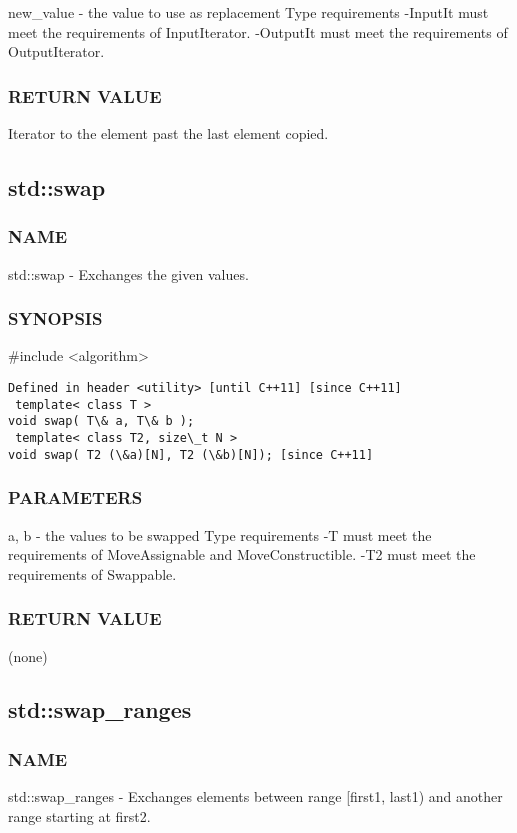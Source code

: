 new\_value - the value to use as replacement
 Type requirements
 -InputIt must meet the requirements of InputIterator.
 -OutputIt must meet the requirements of OutputIterator.

\subsubsection{RETURN VALUE}
Iterator to the element past the last element copied.



\subsection{std::swap}

\subsubsection{NAME}
std::swap - Exchanges the given values.

\subsubsection{SYNOPSIS}
\#include <algorithm>

\begin{lstlisting}
Defined in header <utility> [until C++11] [since C++11]
 template< class T >
void swap( T\& a, T\& b );
 template< class T2, size\_t N >
void swap( T2 (\&a)[N], T2 (\&b)[N]); [since C++11]
\end{lstlisting}

\subsubsection{PARAMETERS}
a, b - the values to be swapped
 Type requirements
 -T must meet the requirements of MoveAssignable and MoveConstructible.
 -T2 must meet the requirements of Swappable.

\subsubsection{RETURN VALUE}
(none)



\subsection{std::swap\_ranges}

\subsubsection{NAME}
std::swap\_ranges - Exchanges elements between range [first1, last1) and another range starting at first2.

